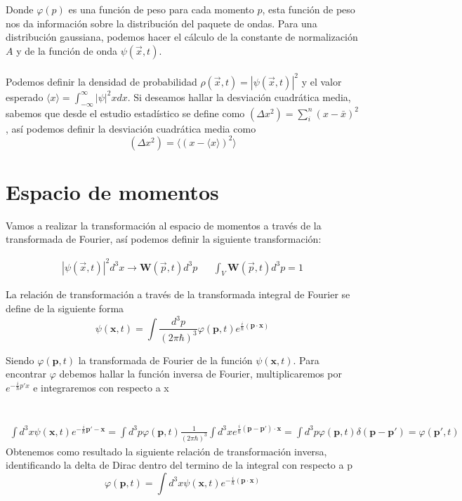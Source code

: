 \documentclass[a4,12pt]{aleph-notas}
\begin{document}
Donde $\varphi(p)$ es una función de peso para cada momento $p$, esta función de peso nos da información sobre la distribución del paquete de ondas. Para una distribución gaussiana, podemos hacer el cálculo de la constante de normalización $A$ y de la función de onda $\psi(\vec{x},t)$.\\\\
Podemos definir la densidad de probabilidad $\rho(\vec{x},t)=\left\vert \psi(\vec{x},t) \right\vert^2 $ y el valor esperado $\langle x\rangle=\int_{-\infty}^{\infty}\left\vert \psi \right\vert^2 x dx$. Si deseamos hallar la desviación cuadrática media, sabemos que desde el estudio estadístico se define como $\left(\Delta x^2\right)=\sum_{i}^{n} \left(x-\bar{x}\right)^2$, así podemos definir la desviación cuadrática media como\\
 \begin{equation}
    \left( \Delta x^2\right)=\langle(x-\langle x\rangle)^2 \rangle
 \end{equation}
\section{Espacio de momentos}

Vamos a realizar la transformación al espacio de momentos a través de la transformada de Fourier, así podemos definir la siguiente transformación:

\begin{align*}
    \left\vert \psi (\vec{x},t)\right\vert^2 d^3x \longrightarrow \mathbf{W} (\vec{p},t)d^3p && \int_{V} \mathbf{W}(\vec{p},t)d^3p=1
\end{align*}

La relación de transformación a través de la transformada integral de Fourier se define de la siguiente forma
\begin{equation}\label{TFourier}
    \psi(\textbf{x},t)=\int\frac{d^3p}{(2\pi\hbar)^3}\varphi(\textbf{p},t)e^{\frac{i}{\hbar}(\textbf{p}\cdot\textbf{x})}
\end{equation}

Siendo $\varphi(\textbf{p},t)$ la transformada de Fourier de la función $\psi(\textbf{x},t)$. Para encontrar $\varphi$ debemos hallar la función inversa de Fourier, multiplicaremos por $e^{-\frac{i}{\hbar}p'x}$ e integraremos con respecto a x \\ \\ \\
\begin{align*}
    \int d^3x \psi(\textbf{x},t)e^{-\frac{i}{\hbar}\textbf{p}'-\textbf{x}}=\int d^3p\varphi(\textbf{p},t) \frac{1}{(2\pi\hbar)^3}\int d^3x e^{\frac{i}{\hbar}(\textbf{p}-\textbf{p}')\cdot \textbf{x}}=\int d^3p \varphi(\textbf{p},t) \delta(\textbf{p}-\textbf{p}')=\varphi(\textbf{p}',t)
\end{align*}
Obtenemos como resultado la siguiente relación de transformación inversa, identificando la delta de Dirac dentro del termino de la integral con respecto a p
\begin{equation}\label{IFourier}
    \varphi(\textbf{p},t)=\int d^3x\psi(\textbf{x},t)e^{-\frac{i}{\hbar}(\textbf{p}\cdot\textbf{x})}
\end{equation}
\end{document}
